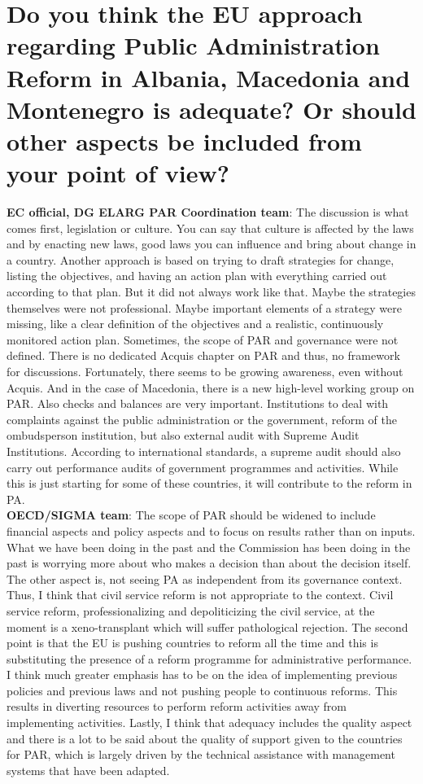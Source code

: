 \section{ Do you think the EU approach regarding Public Administration Reform in Albania, Macedonia and Montenegro is adequate? Or should other aspects be included from your point of view? }
\label{sec:view}
\textbf{EC official, DG ELARG PAR Coordination team}: The discussion is what comes first, legislation or culture. You can say that culture is affected by the laws and by enacting new laws, good laws you can influence and bring about change in a country. Another approach is based on trying to draft strategies for change, listing the objectives, and having an action plan with everything carried out according to that plan. But it did not always work like that. Maybe the strategies themselves were not professional. Maybe important elements of a strategy were missing, like a clear definition of the objectives and a realistic, continuously monitored action plan. Sometimes, the scope of PAR and governance were not defined. There is no dedicated Acquis chapter on PAR and thus, no framework for discussions. Fortunately, there seems to be growing awareness, even without Acquis. And in the case of Macedonia, there is a new  high-level working group on PAR. Also checks and balances are very important. Institutions to deal with complaints against the public administration or the government, reform of the ombudsperson institution, but also external audit with Supreme Audit Institutions. According to international standards, a supreme audit should also carry out performance audits of government programmes and activities. While this is just starting for some of these countries, it will contribute to the reform in PA. \\
\textbf{OECD/SIGMA team}: The scope of PAR should be widened to include financial aspects and policy aspects and to focus on results rather than on inputs. What we have been doing in the past and the Commission has been doing in the past is worrying more about who makes a decision than about the decision itself. The other aspect is, not seeing PA as independent from its governance context. Thus, I think that civil service reform is not appropriate to the context. Civil service reform, professionalizing and depoliticizing the civil service, at the moment is a xeno-transplant which will suffer pathological rejection. The second point is that the EU is pushing countries to reform all the time and this is substituting the presence of a reform programme for administrative performance. I think much greater emphasis has to be on the idea of implementing previous policies and previous laws and not pushing people to continuous reforms. This results in diverting resources to perform reform activities away from implementing activities. Lastly, I think that adequacy includes the quality aspect and there is a lot to be said about the quality of support given to the countries for PAR, which is largely driven by the technical assistance with management systems that have been adapted.\\
